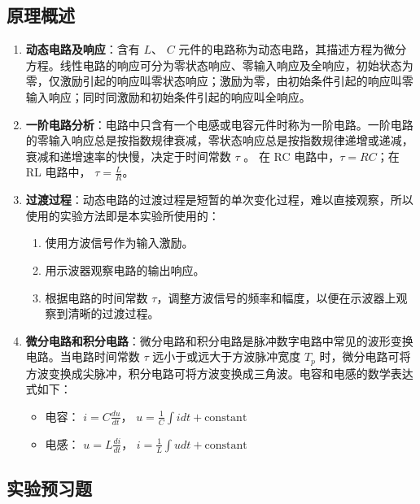 \documentclass[dvipsnames, svgnames,a4paper,11pt]{article}
\begin{document}
	\subsection{原理概述}
	
	\begin{enumerate}
		\item \textbf{动态电路及响应}：含有 \( L \)、 \( C \) 元件的电路称为动态电路，其描述方程为微分方程。线性电路的响应可分为零状态响应、零输入响应及全响应，初始状态为零，仅激励引起的响应叫零状态响应；激励为零，由初始条件引起的响应叫零输入响应；同时同激励和初始条件引起的响应叫全响应。
		
		\item \textbf{一阶电路分析}：电路中只含有一个电感或电容元件时称为一阶电路。一阶电路的零输入响应总是按指数规律衰减，零状态响应总是按指数规律递增或递减，衰减和递增速率的快慢，决定于时间常数 $\tau$ 。
		在 RC 电路中，$\tau=RC$；在 RL 电路中， $\tau=\frac LR$。
		
		\item \textbf{过渡过程}：动态电路的过渡过程是短暂的单次变化过程，难以直接观察，所以使用的实验方法即是本实验所使用的：
		 \begin{enumerate}
			\item 使用方波信号作为输入激励。
			\item 用示波器观察电路的输出响应。
			\item 根据电路的时间常数 \( \tau \)，调整方波信号的频率和幅度，以便在示波器上观察到清晰的过渡过程。
		\end{enumerate}
		
		\item \textbf{微分电路和积分电路}：微分电路和积分电路是脉冲数字电路中常见的波形变换电路。当电路时间常数 \( \tau \) 远小于或远大于方波脉冲宽度 \( T_p \) 时，微分电路可将方波变换成尖脉冲，积分电路可将方波变换成三角波。电容和电感的数学表达式如下：
		
		\begin{itemize}
			\item 电容： \( i= C \frac{du}{dt} \)， \( u = \frac{1}{C} \int i dt + \text{constant} \)
			\item 电感： \( u = L \frac{di}{dt} \)， \( i = \frac{1}{L} \int u dt + \text{constant} \)
		\end{itemize}
		
		
		
	\end{enumerate}
	
	
	
	\subsection{实验预习题}
	
\end{document}

